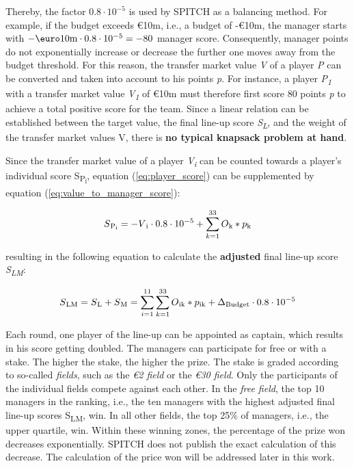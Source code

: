 Thereby, the factor $0.8\cdot10^{-5}$ is used by SPITCH as a balancing method. \parencite[cf.][]{spitch_rules_nodate} For example, if the budget exceeds €10m, i.e., a budget of -€10m, the manager starts with $-\textup{\euro}10\textup{m}\cdot0.8\cdot10^{-5} = -80$ manager score. Consequently, manager points do not exponentially increase or decrease the further one moves away from the budget threshold. For this reason, the transfer market value \emph{V} of a player \emph{P} can be converted and taken into account to his points \emph{p}. For instance, a player \emph{P\textsubscript{1}} with a transfer market value \emph{V\textsubscript{1}} of €10m must therefore first score 80 points \emph{p} to achieve a total positive score for the team. Since a linear relation can be established between the target value, the final line-up score \emph{S\textsubscript{L}}, and the weight of the transfer market values V, there is \textbf{no typical knapsack problem at hand}.

Since the transfer market value of a player \emph{V\textsubscript{i}} can be counted towards a player's individual score S\textsubscript{P\textsubscript{i}}, equation (\ref{eq:player_score}) can be supplemented by equation (\ref{eq:value_to_manager_score}):

\begin{equation}
    S\textsubscript{P\textsubscript{i}} = -V\textsubscript{i}\cdot0.8\cdot10^{-5} + \sum_{k=1}^{33} O\textsubscript{k} * p\textsubscript{k}
    \label{eq:player_score_with_value}
\end{equation}

resulting in the following equation to calculate the \textbf{adjusted} final line-up score \emph{S\textsubscript{LM}}:

\begin{equation}
    S\textsubscript{LM} = S\textsubscript{L} + S\textsubscript{M} = \sum_{i=1}^{11} \sum_{k=1}^{33} O\textsubscript{ik} * p\textsubscript{ik} + \Delta \textsubscript{Budget}\cdot0.8\cdot10^{-5}
    \label{eq:final_score_with_ms}
\end{equation}

Each round, one player of the line-up can be appointed as captain, which results in his score getting doubled. The managers can participate for free or with a stake. The higher the stake, the higher the prize. The stake is graded according to so-called \emph{fields}, such as the \emph{€2 field} or the \emph{€30 field}. Only the participants of the individual fields compete against each other. In the \emph{free field}, the top 10 managers in the ranking, i.e., the ten managers with the highest adjusted final line-up scores {S\textsubscript{LM}}, win. In all other fields, the top 25\% of managers, i.e., the upper quartile, win. Within these winning zones, the percentage of the prize won decreases exponentially. SPITCH does not publish the exact calculation of this decrease. The calculation of the price won will be addressed later in this work.
